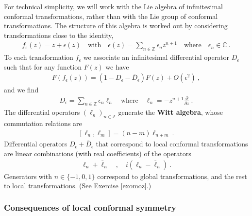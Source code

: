 \documentclass[12pt, a4paper, notitlepage, twoside]{report}
\numberwithin{equation}{section}
\theoremstyle{break}
\begin{document}
For technical simplicity, we will work with the Lie algebra of infinitesimal conformal transformations, rather than with the Lie group of conformal transformations.
The structure of this algebra is worked out by considering transformations close to the identity, 
\begin{align}
 f_{\epsilon}(z) = z + \epsilon(z) \quad \text{with} \quad \epsilon(z) = \sum_{n\in{\mathbb{Z}}} \epsilon_n z^{n+1} \quad 
 \text{where} \quad \epsilon_n\in\mathbb{C}\ .
\label{sen}
\end{align}
To each transformation $f_\epsilon$ we associate an infinitesimal differential operator $D_\epsilon$ such that for any function $F(z)$ we have 
\begin{align}
 F(f_\epsilon(z)) = \left(1- D_\epsilon -\bar{D}_\epsilon \right)F(z) + O(\epsilon^2)\ ,
\label{ffe}
\end{align}
and we find
\begin{align}
 D_\epsilon = \sum_{n\in {\mathbb{Z}}} \epsilon_n\ell_n  \quad \text{where} \quad \boxed{\ell_n= -z^{n+1}{\frac{\partial}{\partial z}}} \ .
\label{elln}
\end{align}
The differential operators $(\ell_n)_{n\in {\mathbb{Z}}}$ generate the \textbf{\boldmath Witt algebra}, whose commutation relations are
\begin{align}
 \boxed{[\ell_n,\ell_m]=(n-m)\ell_{n+m}}\ .
\end{align}
Differential operators $D_\epsilon +\bar{D}_\epsilon$ that correspond to local conformal transformations are linear combinations (with real coefficients) of the operators
\begin{align}
 \ell_n + \bar\ell_n \quad , \quad i(\ell_n-\bar\ell_n) \ .
 \label{ilml}
\end{align}
Generators with $n\in\{-1,0,1\}$ correspond to global transformations, and the rest to local transformations. (See Exercise \ref{exomoz}.) 

\subsubsection{Consequences of local conformal symmetry}
\end{document}
